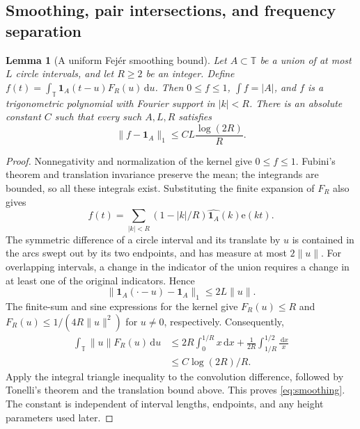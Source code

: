 \documentclass[12pt,leqno]{article}
\numberwithin{equation}{section}
\newtheorem{lemma}[theorem]{Lemma}
\theoremstyle{remark}
\newcommand{\LRtorus}{\mathbb T}
\newcommand{\LRindicator}{\mathbf 1}
\newcommand{\LRdifferential}{\,\mathrm d}
\begin{document}
\subsection{Smoothing, pair intersections, and frequency separation}
\begin{lemma}[A uniform Fej\'er smoothing bound]\label{lem:smoothing}
Let $A\subset\LRtorus$ be a union of at most $L$ circle intervals, and let $R\ge2$ be an integer. Define
$f(t)=\int_{\LRtorus}\LRindicator_A(t-u)F_R(u)\LRdifferential u$. Then
$0\le f\le1$, $\int f=|A|$, and $f$ is a trigonometric polynomial with Fourier support in $|k|<R$. There is an absolute constant $C$ such that every such $A,L,R$ satisfies
\begin{equation}\label{eq:smoothing}
\|f-\LRindicator_A\|_1\le CL\frac{\log(2R)}R.
\end{equation}
\end{lemma}
\begin{proof}
Nonnegativity and normalization of the kernel give $0\le f\le1$. Fubini's theorem and translation invariance preserve the mean; the integrands are bounded, so all these integrals exist. Substituting the finite expansion of $F_R$ also gives
\[
f(t)=\sum_{|k|<R}(1-|k|/R)\widehat{\LRindicator_A}(k)\mathrm e(kt).
\]
The symmetric difference of a circle interval and its translate by $u$ is contained in the arcs swept out by its two endpoints, and has measure at most $2\|u\|$. For overlapping intervals, a change in the indicator of the union requires a change in at least one of the original indicators. Hence
\[
\|\LRindicator_A(\cdot-u)-\LRindicator_A\|_1\le2L\|u\|.
\]
The finite-sum and sine expressions for the kernel give $F_R(u)\le R$ and
$F_R(u)\le1/(4R\|u\|^2)$ for $u\ne0$, respectively. Consequently,
\begin{align*}
\int_{\LRtorus}\|u\|F_R(u)\LRdifferential u
&\le2R\int_0^{1/R}x\LRdifferential x
+\frac1{2R}\int_{1/R}^{1/2}\frac{\LRdifferential x}x\\
&\le C\log(2R)/R.
\end{align*}
Apply the integral triangle inequality to the convolution difference, followed by Tonelli's theorem and the translation bound above. This proves \eqref{eq:smoothing}. The constant is independent of interval lengths, endpoints, and any height parameters used later.
\end{proof}
\end{document}
